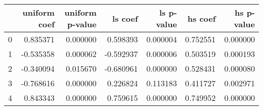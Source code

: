 \begin{tabular}{lrrrrrr}
\toprule
 & uniform coef & uniform p-value & ls coef & ls p-value & hs coef & hs p-value \\
\midrule
0 & 0.835371 & 0.000000 & 0.598393 & 0.000004 & 0.752551 & 0.000000 \\
1 & -0.535358 & 0.000062 & -0.592937 & 0.000006 & 0.503519 & 0.000193 \\
2 & -0.340094 & 0.015670 & -0.680961 & 0.000000 & 0.528431 & 0.000080 \\
3 & -0.768616 & 0.000000 & 0.226824 & 0.113183 & 0.411727 & 0.002971 \\
4 & 0.843343 & 0.000000 & 0.759615 & 0.000000 & 0.749952 & 0.000000 \\
\bottomrule
\end{tabular}
